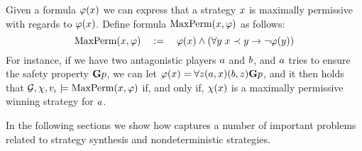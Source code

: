 \begin{example}
  Given a formula $\phi(\var)$ we can express that a strategy $\var$
  is maximally permissive with regards to  $\phi(\var)$. Define formula $\maxperm(\var,\phi)$ as
  follows:
  \[\maxperm(\var,\phi) \quad := \quad \phi(\var) \wedge (\forall \varb \;
    \var \refinesstr \varb \impl \neg \phi(\varb))\]
  For instance, if we have two antagonistic players $\ag$ and $\agb$,
  and $\ag$ tries to ensure the safety property $\always p$, we can let $\phi(\var)=\forall \varc
  \bind[\ag]{\var}\bind[\agb]{\varc}\always p$, and it then holds that
  $\CGS,\assign,\pos_\init\models \maxperm(\var,\phi)$ if, and only
  if, $\assign(\var)$ is a maximally permissive winning strategy for $\ag$.
\end{example}

In the following sections we  show how \SLref captures a number of
important problems related to strategy synthesis and nondeterministic strategies. 






